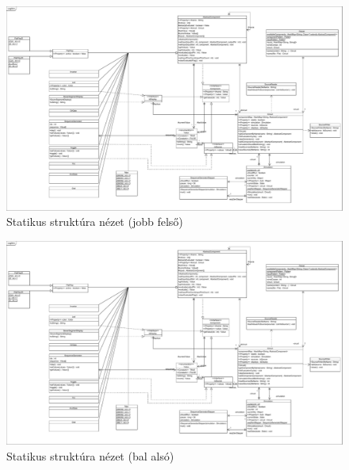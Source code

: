 \begin{figure}[H]
\begin{center}
\includegraphics*[angle=90, width=14cm, viewport = 765 475 1530 930]{chapters/chapter03/classdiagram/class_diagram.pdf}
\caption{Statikus struktúra nézet (jobb felső)}
\label{fig:class_diagram}
\end{center}
\end{figure}

\begin{figure}[H]
\begin{center}
\includegraphics*[angle=90, width=14cm, viewport = 0 0 765 475]{chapters/chapter03/classdiagram/class_diagram.pdf}
\caption{Statikus struktúra nézet (bal alsó)}
\label{fig:class_diagram}
\end{center}
\end{figure}

